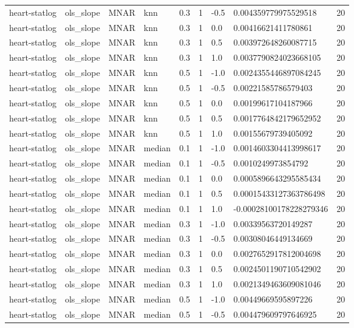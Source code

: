\begin{tabular}{lllllllll}
heart-statlog & ols\_slope & MNAR & knn & 0.3 & 1 & -0.5 & 0.004359779975529518 & 20 \\
heart-statlog & ols\_slope & MNAR & knn & 0.3 & 1 & 0.0 & 0.00416621411780861 & 20 \\
heart-statlog & ols\_slope & MNAR & knn & 0.3 & 1 & 0.5 & 0.003972648260087715 & 20 \\
heart-statlog & ols\_slope & MNAR & knn & 0.3 & 1 & 1.0 & 0.0037790824023668105 & 20 \\
heart-statlog & ols\_slope & MNAR & knn & 0.5 & 1 & -1.0 & 0.0024355446897084245 & 20 \\
heart-statlog & ols\_slope & MNAR & knn & 0.5 & 1 & -0.5 & 0.00221585786579403 & 20 \\
heart-statlog & ols\_slope & MNAR & knn & 0.5 & 1 & 0.0 & 0.00199617104187966 & 20 \\
heart-statlog & ols\_slope & MNAR & knn & 0.5 & 1 & 0.5 & 0.0017764842179652952 & 20 \\
heart-statlog & ols\_slope & MNAR & knn & 0.5 & 1 & 1.0 & 0.00155679739405092 & 20 \\
heart-statlog & ols\_slope & MNAR & median & 0.1 & 1 & -1.0 & 0.0014603304413998617 & 20 \\
heart-statlog & ols\_slope & MNAR & median & 0.1 & 1 & -0.5 & 0.0010249973854792 & 20 \\
heart-statlog & ols\_slope & MNAR & median & 0.1 & 1 & 0.0 & 0.0005896643295585434 & 20 \\
heart-statlog & ols\_slope & MNAR & median & 0.1 & 1 & 0.5 & 0.00015433127363786498 & 20 \\
heart-statlog & ols\_slope & MNAR & median & 0.1 & 1 & 1.0 & -0.00028100178228279346 & 20 \\
heart-statlog & ols\_slope & MNAR & median & 0.3 & 1 & -1.0 & 0.00339563720149287 & 20 \\
heart-statlog & ols\_slope & MNAR & median & 0.3 & 1 & -0.5 & 0.00308046449134669 & 20 \\
heart-statlog & ols\_slope & MNAR & median & 0.3 & 1 & 0.0 & 0.0027652917812004698 & 20 \\
heart-statlog & ols\_slope & MNAR & median & 0.3 & 1 & 0.5 & 0.0024501190710542902 & 20 \\
heart-statlog & ols\_slope & MNAR & median & 0.3 & 1 & 1.0 & 0.0021349463609081046 & 20 \\
heart-statlog & ols\_slope & MNAR & median & 0.5 & 1 & -1.0 & 0.00449669595897226 & 20 \\
heart-statlog & ols\_slope & MNAR & median & 0.5 & 1 & -0.5 & 0.004479609797646925 & 20 \\

\end{tabular}
